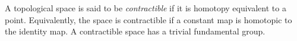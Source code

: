 \documentclass[12pt]{article}
\begin{document}
A topological space is said to be \emph{contractible} if it is homotopy equivalent to a point. Equivalently, the space is contractible if a constant map is homotopic to the identity map. A contractible space has a trivial fundamental group.
\end{document}
